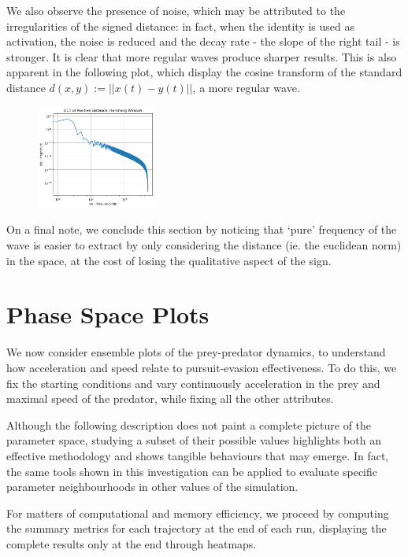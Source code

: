 \documentclass[10pt, twocolumn]{article}
\begin{document}
        We also observe the presence of noise, which may be attributed to the irregularities of the signed distance: in fact, when the identity is used as activation, the noise is reduced and the decay rate - the slope of the right tail - is stronger. It is clear that more regular waves produce sharper results. This is also apparent in the following plot, which display the cosine transform of the standard distance $d(x,y) := ||x(t)-y(t)||$, a more regular wave.

        \begin{figure}[H]
          \centering
          \includegraphics[width=0.35\textwidth]{figures/dct_positive_0.png}
          \label{fig:loglog-positive}
        \end{figure}        

        On a final note, we conclude this section by noticing that `pure' frequency of the wave is easier to extract by only considering the distance (ie. the euclidean norm) in the space, at the cost of losing the qualitative aspect of the sign.

        \section{Phase Space Plots}
        We now consider ensemble plots of the prey-predator dynamics, to understand how acceleration and speed relate to pursuit-evasion effectiveness. To do this, we fix the starting conditions and vary continuously acceleration in the prey and maximal speed of the predator, while fixing all the other attributes.

        Although the following description does not paint a complete picture of the parameter space, studying a subset of their possible values highlights both an effective methodology and shows tangible behaviours that may emerge. In fact, the same tools shown in this investigation can be applied to evaluate specific parameter neighbourhoods in other values of the simulation.

        For matters of computational and memory efficiency, we proceed by computing the summary metrics for each trajectory at the end of each run, displaying the complete results only at the end through heatmaps.
\end{document}
